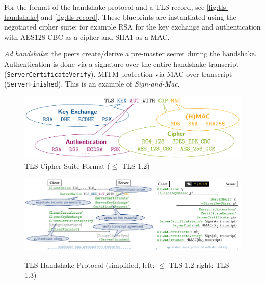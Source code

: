 For the format of the handshake protocol and a TLS record,
see \autoref{fig:tls-handshake} and \autoref{fig:tls-record}.
These blueprints are instantiated using the negotiated cipher suite:
for example RSA for the key exchange and authentication with AES128-CBC as a cipher and SHA1 as a MAC.

\emph{Ad handshake}:
the peers create/derive a pre-master secret during the handshake.
Authentication is done via a signature over the entire handshake transcript (\texttt{ServerCertificateVerify}).
MITM protection via MAC over transcript (\texttt{ServerFinished}).
This is an example of \emph{Sign-and-Mac}.

\begin{figure}[h]
    \centering
	\includegraphics[scale=0.3]{images/tls-cipher-suite.png}
    \caption{TLS Cipher Suite Format ($\leq$ TLS 1.2)}
    \label{fig:tls-cipher-suite}
\end{figure}

\begin{figure}[h]
    \centering
	\includegraphics[width=0.6\textwidth]{images/tls-handshake-12.png}\includegraphics[width=0.4\textwidth]{images/tls-handshake-13.png}
    \caption{TLS Handshake Protocol (simplified, left: $\leq$ TLS 1.2 right: TLS 1.3)}
    \label{fig:tls-handshake}
\end{figure}

